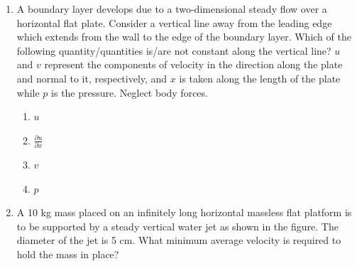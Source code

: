 \documentclass[journal]{IEEEtran}
\numberwithin{equation}{enumi}
\numberwithin{figure}{enumi}
\begin{document}
\begin{enumerate}
    \item A boundary layer develops due to a two-dimensional steady flow over a horizontal flat plate. Consider a vertical line away from the leading edge which extends from the wall to the edge of the boundary layer. Which of the following quantity/quantities is/are not constant along the vertical line? $u$ and $v$ represent the components of velocity in the direction along the plate and normal to it, respectively, and $x$ is taken along the length of the plate while $p$ is the pressure. Neglect body forces.
    \begin{enumerate}
        \item $u$
        \item $\frac{\partial u}{\partial x}$
        \item $v$
        \item $p$
    \end{enumerate}
\bigskip
    \item A 10 kg mass placed on an infinitely long horizontal massless flat platform is to be supported by a steady vertical water jet as shown in the figure. The diameter of the jet is 5 cm. What minimum average velocity is required to hold the mass in place?
\begin{figure}[H] %
\centering
{}
\end{figure}
\end{enumerate}
\end{document}
